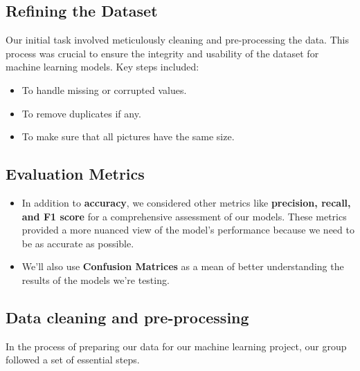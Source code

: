 \documentclass{modeleRapport}
\begin{document}
\subsection{Refining the Dataset}
Our initial task involved meticulously cleaning and pre-processing the data. This process was crucial to ensure the integrity and usability of the dataset for machine learning models. Key steps included: 
\begin{itemize}
    \item To handle missing or corrupted values.
    \item To remove duplicates if any.
    \item To make sure that all pictures have the same size.
\end{itemize}

\subsection{Evaluation Metrics}

\begin{itemize}
    \item In addition to \textbf{accuracy}, we considered other metrics like \textbf{precision, recall, and F1 score} for a comprehensive assessment of our models. These metrics provided a more nuanced view of the model's performance because we need to be as accurate as possible. 
    \item We'll also use \textbf{Confusion Matrices} as a mean of better understanding the results of the models we're testing.
\end{itemize}

\subsection{Data cleaning and pre-processing}

In the process of preparing our data for our machine learning project, our group followed a set of essential steps.
\end{document}
